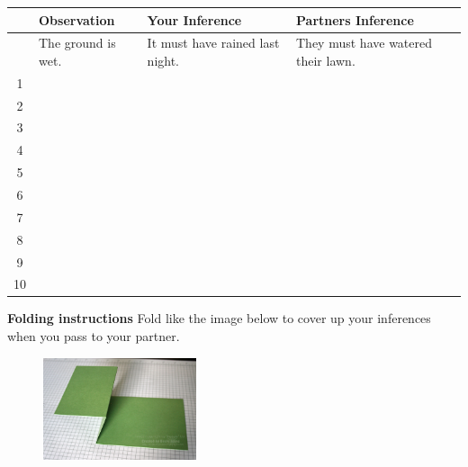 \documentclass[14pt, fleqn, paper=letter, oneside]{scrartcl}
\begin{document}
\begin{table}[h]
\renewcommand{\arraystretch}{2.5}
\centering
\begin{tabularx}{\textwidth}{|c|X|X|X|}
\hline
  & Observation
  & Your Inference
  & Partners Inference 
\\\hline
  & The ground is wet.                                                                                                              & It must have rained last night.                                                                                                                     & They must have watered their lawn.                  \\ \hline
1 &                                                                                                                                 &                                                                                                                                                     &                                                     \\ \hline
2 &&&\\ \hline
3 &&&\\ \hline
4 &&&\\ \hline
5 &&&\\ \hline
6 &&&\\ \hline
7 &&&\\ \hline
8 &&&\\ \hline
9 &&&\\ \hline
10 &&&\\ \hline
\end{tabularx}
\end{table}

\textbf{Folding instructions}
Fold like the image below to cover up your inferences when you pass to your partner.

\begin{figure}[h]
\centering
\includegraphics[height=30mm]{fold}

\end{figure}
\end{document}
